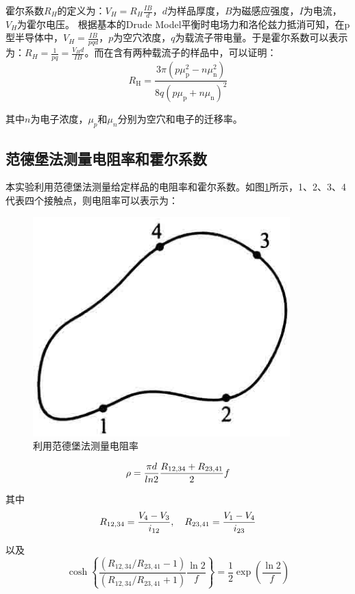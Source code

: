 \documentclass{buaaemp}
\begin{document}
	霍尔系数$R_H$的定义为：$V_H=R_H\frac{IB}{d}$，$d$为样品厚度，$B$为磁感应强度，$I$为电流，$V_H$为霍尔电压。
	根据基本的Drude Model平衡时电场力和洛伦兹力抵消可知，在p型半导体中，$V_H=\frac{IB}{pqd}$，$p$为空穴浓度，$q$为载流子带电量。于是霍尔系数可以表示为：$R_H=\frac{1}{pq}=\frac{V_H d}{IB}$。而在含有两种载流子的样品中，可以证明\cite{solidstatephysics}：
	\begin{equation}
		R_{\mathrm{H}}=\frac{3 \pi\left(p \mu_{\mathrm{p}}^{2}-n \mu_{\mathrm{n}}^{2}\right)}{8 q\left(p \mu_{\mathrm{p}}+n \mu_{\mathrm{n}}\right)^{2}}
		\label{equation:hall}
	\end{equation}
	
	其中$n$为电子浓度，$\mu_p$和$\mu_n$分别为空穴和电子的迁移率。
 
	\subsection{范德堡法测量电阻率和霍尔系数}
	本实验利用范德堡法测量给定样品的电阻率和霍尔系数。如图\ref{fourpoint}所示，1、2、3、4代表四个接触点，则电阻率可以表示为\cite{钱建强2016近代物理实验}：
	\begin{figure}[htbp]
		\centering
		\includegraphics[width=0.3\linewidth]{./image/fourpoint.png}
		\caption{利用范德堡法测量电阻率}
		\label{fourpoint}
	\end{figure}
 
	\begin{equation}
		\centering
		\rho=\frac{\pi d}{ln2}\frac{R_{12,34}+R_{23,41}}{2}f
	\end{equation}

	其中
	\begin{equation}
		\centering
		R_{12,34}=\frac{V_{4}-V_{3}}{i_{12}}, \quad R_{23,41}=\frac{V_{1}-V_{4}}{i_{23}}
	\end{equation}

	以及
	\begin{equation}
		\cosh \left\{\frac{\left(R_{12,34} / R_{23,41}-1\right)}{\left(R_{12,34} / R_{23,41}+1\right)} \frac{\ln 2}{f}\right\}=\frac{1}{2} \exp \left(\frac{\ln 2}{f}\right)
	\end{equation}
\end{document}
